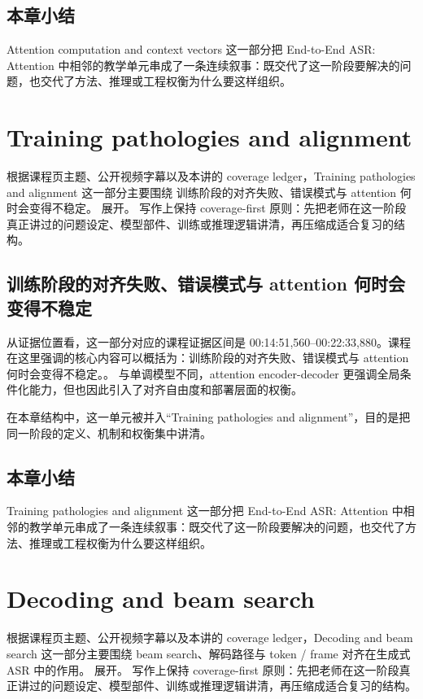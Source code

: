 \documentclass[a4paper]{article}
\begin{document}
\subsection{本章小结}
Attention computation and context vectors 这一部分把 End-to-End ASR: Attention 中相邻的教学单元串成了一条连续叙事：既交代了这一阶段要解决的问题，也交代了方法、推理或工程权衡为什么要这样组织。

\section{Training pathologies and alignment}
根据课程页主题、公开视频字幕以及本讲的 coverage ledger，Training pathologies and alignment 这一部分主要围绕 训练阶段的对齐失败、错误模式与 attention 何时会变得不稳定。 展开。
写作上保持 coverage-first 原则：先把老师在这一阶段真正讲过的问题设定、模型部件、训练或推理逻辑讲清，再压缩成适合复习的结构。

\subsection{训练阶段的对齐失败、错误模式与 attention 何时会变得不稳定}
从证据位置看，这一部分对应的课程证据区间是 00:14:51,560--00:22:33,880。课程在这里强调的核心内容可以概括为：训练阶段的对齐失败、错误模式与 attention 何时会变得不稳定。。
与单调模型不同，attention encoder-decoder 更强调全局条件化能力，但也因此引入了对齐自由度和部署层面的权衡。

在本章结构中，这一单元被并入“Training pathologies and alignment”，目的是把同一阶段的定义、机制和权衡集中讲清。

\subsection{本章小结}
Training pathologies and alignment 这一部分把 End-to-End ASR: Attention 中相邻的教学单元串成了一条连续叙事：既交代了这一阶段要解决的问题，也交代了方法、推理或工程权衡为什么要这样组织。

\section{Decoding and beam search}
根据课程页主题、公开视频字幕以及本讲的 coverage ledger，Decoding and beam search 这一部分主要围绕 beam search、解码路径与 token / frame 对齐在生成式 ASR 中的作用。 展开。
写作上保持 coverage-first 原则：先把老师在这一阶段真正讲过的问题设定、模型部件、训练或推理逻辑讲清，再压缩成适合复习的结构。
\end{document}
